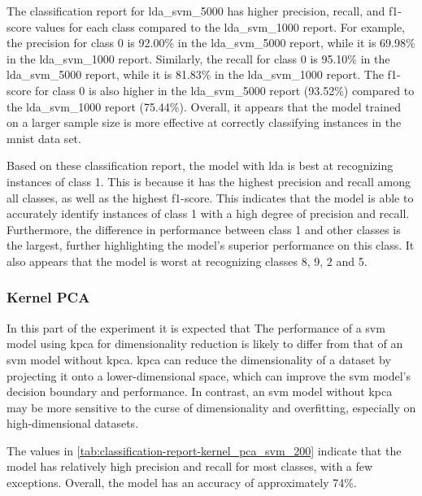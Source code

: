 

The classification report for lda\_svm\_5000 has higher precision, recall, and f1-score values for each class compared to the lda\_svm\_1000 report. For example, the precision for class 0 is 92.00\% in the lda\_svm\_5000 report, while it is 69.98\% in the lda\_svm\_1000 report. Similarly, the recall for class 0 is 95.10\% in the lda\_svm\_5000 report, while it is 81.83\% in the lda\_svm\_1000 report. The f1-score for class 0 is also higher in the lda\_svm\_5000 report (93.52\%) compared to the lda\_svm\_1000 report (75.44\%). Overall, it appears that the model trained on a larger sample size is more effective at correctly classifying instances in the \gls{mnist} data set.

Based on these classification report, the model with \gls{lda} is best at recognizing instances of class 1. This is because it has the highest precision and recall among all classes, as well as the highest f1-score. This indicates that the model is able to accurately identify instances of class 1 with a high degree of precision and recall. Furthermore, the difference in performance between class 1 and other classes is the largest, further highlighting the model's superior performance on this class. It also appears that the model is worst at recognizing classes 8, 9, 2 and 5.

\subsubsection{Kernel PCA}\label{subsubsec:experiment_4_kernel_pca}
In this part of the experiment it is expected that The performance of a \gls{svm} model using  \gls{kpca} for dimensionality reduction is likely to differ from that of an \gls{svm} model without \gls{kpca}. \gls{kpca} can reduce the dimensionality of a dataset by projecting it onto a lower-dimensional space, which can improve the \gls{svm} model's decision boundary and performance. In contrast, an \gls{svm} model without \gls{kpca} may be more sensitive to the curse of dimensionality and overfitting, especially on high-dimensional datasets.




The values in \autoref{tab:classification-report-kernel_pca_svm_200} indicate that the model has relatively high precision and recall for most classes, with a few exceptions. Overall, the model has an accuracy of approximately 74\%.

